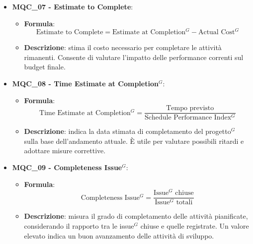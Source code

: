 \begin{itemize}
\item \textbf{MQC\_07 - Estimate to Complete}:
    \begin{itemize}
        \item \textbf{Formula}:
        \[
            \text{Estimate to Complete} = \text{Estimate at Completion$^G$} - \text{Actual Cost$^G$}
        \]
        \item \textbf{Descrizione}: stima il costo necessario per completare le attività rimanenti. Consente di valutare l’impatto delle performance correnti sul budget finale.
    \end{itemize}

\item \textbf{MQC\_08 - Time Estimate at Completion$^G$}:
    \begin{itemize}
        \item \textbf{Formula}:
        \[
            \text{Time Estimate at Completion$^G$} =
            \frac{\text{Tempo previsto}}{\text{Schedule Performance Index$^G$}}
        \]
        \item \textbf{Descrizione}: indica la data stimata di completamento del progetto$^G$ sulla base dell’andamento attuale. È utile per valutare possibili ritardi e adottare misure correttive.
    \end{itemize}

\item \textbf{MQC\_09 - Completeness Issue$^G$}:
    \begin{itemize}
        \item \textbf{Formula}:
        \[
            \text{Completeness Issue$^G$} =
            \frac{\text{Issue$^G$ chiuse}}{\text{Issue$^G$ totali}}
        \]
        \item \textbf{Descrizione}: misura il grado di completamento delle attività pianificate, considerando il rapporto tra le issue$^G$ chiuse e quelle registrate. Un valore elevato indica un buon avanzamento delle attività di sviluppo.
    \end{itemize}
\end{itemize}

